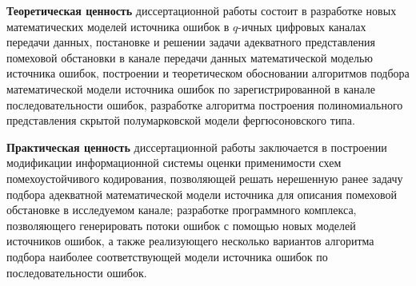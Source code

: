 \documentclass[twoside,12pt]{article}
\begin{document}

\textbf{Теоретическая ценность} диссертационной работы состоит в разработке новых математических моделей источника ошибок в $q$-ичных цифровых каналах передачи данных, постановке и решении задачи адекватного представления помеховой обстановки в канале передачи данных математической моделью источника ошибок, построении и теоретическом обосновании алгоритмов подбора математической модели источника ошибок по зарегистрированной в канале последовательности ошибок, разработке алгоритма построения полиномиального представления скрытой полумарковской модели фергюсоновского типа.

\textbf{Практическая ценность} диссертационной работы заключается в построении модификации информационной системы оценки применимости схем помехоустойчивого кодирования, позволяющей решать нерешенную ранее задачу подбора адекватной математической модели источника для описания помеховой обстановке в исследуемом канале; разработке программного комплекса, позволяющего генерировать потоки ошибок с помощью новых моделей источников ошибок, а также реализующего несколько вариантов алгоритма подбора наиболее соответствующей модели источника ошибок по последовательности ошибок.

%
%
\end{document}
